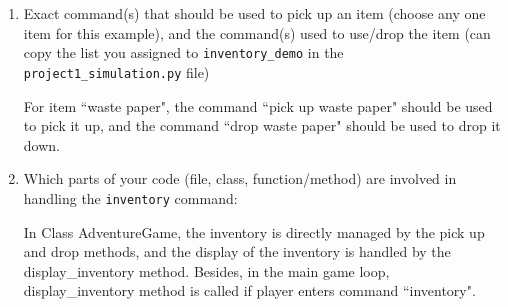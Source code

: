 \documentclass[11pt]{article}
\begin{document}
\begin{enumerate}
\begin{enumerate}
\begin{itemize}
    \item Item target location ID: 6
    \end{itemize}
        \item For Item 7:
    \begin{itemize}
    \item Item name: waste bottle
    \item Item start location ID: 0
    \item Item target location ID: 6
    \end{itemize}
        \item For Item 8:
    \begin{itemize}
    \item Item name: vegetable peelings
    \item Item start location ID: 0
    \item Item target location ID: 6
    \end{itemize}
        \item For Item 9:
    \begin{itemize}
    \item Item name: textbook
    \item Item start location ID: 1
    \item Item target location ID: 3
    \end{itemize}
\end{enumerate}

    \item Exact command(s) that should be used to pick up an item (choose any one item for this example), and the command(s) used to use/drop the item (can copy the list you assigned to \texttt{inventory\_demo} in the \texttt{project1\_simulation.py} file)

    For item ``waste paper", the command ``pick up waste paper" should be used to pick it up, and the command ``drop waste paper" should be used to drop it down.

    \item Which parts of your code (file, class, function/method) are involved in handling the \texttt{inventory} command:

    In Class AdventureGame, the inventory is directly managed by the pick up and drop methods, and the display of the inventory is handled by the display\_inventory method. Besides, in the main game loop, display\_inventory method is called if player enters command ``inventory".

\end{enumerate}
\end{document}

